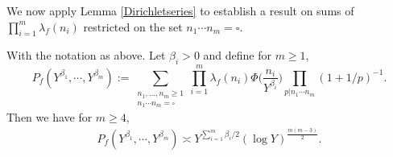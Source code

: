 \documentclass[twoside,leqno,10pt, A4]{amsart}
\begin{document}
   We now apply Lemma \ref{Dirichletseries} to establish a result on sums of $\prod_{i=1}^{m}\lambda_f(n_i)$ restricted on the set $n_1\cdots n_m=\square$.
\begin{lemma}
\label{sumoversquare}
  With the notation as above. Let $\beta_i >0$ and define for $m \geq 1$,
\begin{equation*}
 P_f(Y^{\beta_1}, \cdots, Y^{\beta_m}):=\sum_{\substack{n_1,\dots,n_m \geq 1\\ n_1\cdots n_m=\square}} \prod_{i=1}^{m}\lambda_f(n_i)\Phi\Big(\frac{n_i}{Y^{\beta_i}}\Big)\prod_{p|n_1\cdots n_m}(1+1/p)^{-1}.
\end{equation*}
  Then we have for $m \geq 4$,
\begin{align}
\label{Pfest}
 P_f(Y^{\beta_1}, \cdots, Y^{\beta_m}) \asymp Y^{\sum^m_{i=1}\beta_i/2}(\log Y)^{\frac {m(m-3)}{2}}.
\end{align}
\end{lemma}
\end{document}
